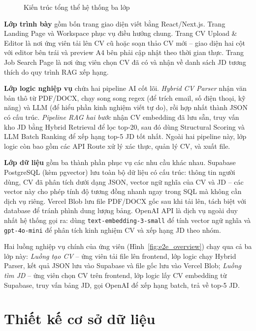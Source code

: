 \documentclass[../DoAn.tex]{subfiles}
\begin{document}
\begin{figure}[H]
{
}
\caption{Kiến trúc tổng thể hệ thống ba lớp}
\label{fig:architecture}
\end{figure}

\textbf{Lớp trình bày} gồm bốn trang giao diện viết bằng React/Next.js. Trang Landing Page và Workspace phục vụ điều hướng chung. Trang CV Upload \& Editor là nơi ứng viên tải lên CV cũ hoặc soạn thảo CV mới -- giao diện hai cột với editor bên trái và preview A4 bên phải cập nhật theo thời gian thực. Trang Job Search Page là nơi ứng viên chọn CV đã có và nhận về danh sách JD tương thích do quy trình RAG xếp hạng.

\textbf{Lớp logic nghiệp vụ} chứa hai pipeline AI cốt lõi. \textit{Hybrid CV Parser} nhận văn bản thô từ PDF/DOCX, chạy song song regex (để trích email, số điện thoại, kỹ năng) và LLM (để hiểu phần kinh nghiệm viết tự do), rồi hợp nhất thành JSON có cấu trúc. \textit{Pipeline RAG hai bước} nhận CV embedding đã lưu sẵn, truy vấn kho JD bằng Hybrid Retrieval để lọc top-20, sau đó dùng Structural Scoring và LLM Batch Ranking để xếp hạng top-5 JD tốt nhất. Ngoài hai pipeline này, lớp logic còn bao gồm các API Route xử lý xác thực, quản lý CV, và xuất file.

\textbf{Lớp dữ liệu} gồm ba thành phần phục vụ các nhu cầu khác nhau. Supabase PostgreSQL (kèm pgvector) lưu toàn bộ dữ liệu có cấu trúc: thông tin người dùng, CV đã phân tích dưới dạng JSON, vector ngữ nghĩa của CV và JD -- các vector này cho phép tính độ tương đồng nhanh ngay trong SQL mà không cần dịch vụ riêng. Vercel Blob lưu file PDF/DOCX gốc sau khi tải lên, tách biệt với database để tránh phình dung lượng bảng. OpenAI API là dịch vụ ngoài duy nhất hệ thống gọi ra: dùng \texttt{text-embedding-3-small} để tính vector ngữ nghĩa và \texttt{gpt-4o-mini} để phân tích kinh nghiệm CV và xếp hạng JD theo nhóm.

Hai luồng nghiệp vụ chính của ứng viên (Hình~\ref{fig:e2e_overview}) chạy qua cả ba lớp này: \textit{Luồng tạo CV} -- ứng viên tải file lên frontend, lớp logic chạy Hybrid Parser, kết quả JSON lưu vào Supabase và file gốc lưu vào Vercel Blob; \textit{Luồng tìm JD} -- ứng viên chọn CV trên frontend, lớp logic lấy CV embedding từ Supabase, truy vấn bảng JD, gọi OpenAI để xếp hạng batch, trả về top-5 JD.

\section{Thiết kế cơ sở dữ liệu}
\end{document}
